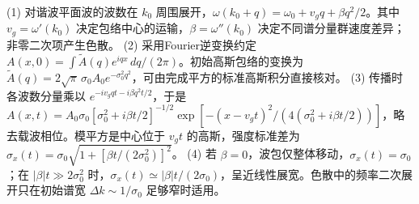 (1) 对谐波平面波的波数在 \(k_0\) 周围展开，\(\omega(k_0+q)=\omega_0+v_gq+\beta q^2/2\)。其中 \(v_g=\omega'(k_0)\) 决定包络中心的运输，\(\beta=\omega''(k_0)\) 决定不同谱分量群速度差异；非零二次项产生色散。
(2) 采用Fourier逆变换约定 \(A(x,0)=\int\tilde A(q)e^{iqx}\,dq/(2\pi)\)。初始高斯包络的变换为 \(\tilde A(q)=2\sqrt\pi\,\sigma_0A_0e^{-\sigma_0^2q^2}\)，可由完成平方的标准高斯积分直接核对。
(3) 传播时各波数分量乘以 \(e^{-iv_gqt-i\beta q^2t/2}\)，于是 \(A(x,t)=A_0\sigma_0[\sigma_0^2+i\beta t/2]^{-1/2}\exp[-(x-v_gt)^2/(4(\sigma_0^2+i\beta t/2))]\)，略去载波相位。模平方是中心位于 \(v_gt\) 的高斯，强度标准差为 \(\sigma_x(t)=\sigma_0\sqrt{1+[\beta t/(2\sigma_0^2)]^2}\)。
(4) 若 \(\beta=0\)，波包仅整体移动，\(\sigma_x(t)=\sigma_0\)；在 \(|\beta|t\gg2\sigma_0^2\) 时，\(\sigma_x(t)\simeq|\beta|t/(2\sigma_0)\)，呈近线性展宽。色散中的频率二次展开只在初始谱宽 \(\Delta k\sim1/\sigma_0\) 足够窄时适用。
